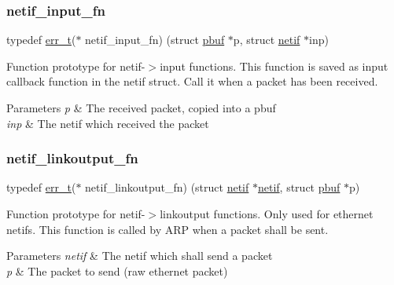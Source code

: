 \subsubsection{\texorpdfstring{netif\+\_\+input\+\_\+fn}{netif\_input\_fn}}
{\footnotesize\ttfamily typedef \hyperlink{group__infrastructure__errors_gaf02d9da80fd66b4f986d2c53d7231ddb}{err\+\_\+t}($\ast$ netif\+\_\+input\+\_\+fn) (struct \hyperlink{structpbuf}{pbuf} $\ast$p, struct \hyperlink{structnetif}{netif} $\ast$inp)}

Function prototype for netif-\/$>$input functions. This function is saved as \textquotesingle{}input\textquotesingle{} callback function in the netif struct. Call it when a packet has been received.


\begin{DoxyParams}{Parameters}
{\em p} & The received packet, copied into a pbuf \\
\hline
{\em inp} & The netif which received the packet \\
\hline
\end{DoxyParams}
\mbox{\label{openmote-cc2538_2lwip_2src_2include_2lwip_2netif_8h_ab75e9d808bc1b788bea84213e6a111ed}} 
\subsubsection{\texorpdfstring{netif\+\_\+linkoutput\+\_\+fn}{netif\_linkoutput\_fn}}
{\footnotesize\ttfamily typedef \hyperlink{group__infrastructure__errors_gaf02d9da80fd66b4f986d2c53d7231ddb}{err\+\_\+t}($\ast$ netif\+\_\+linkoutput\+\_\+fn) (struct \hyperlink{structnetif}{netif} $\ast$\hyperlink{structnetif}{netif}, struct \hyperlink{structpbuf}{pbuf} $\ast$p)}

Function prototype for netif-\/$>$linkoutput functions. Only used for ethernet netifs. This function is called by A\+RP when a packet shall be sent.


\begin{DoxyParams}{Parameters}
{\em netif} & The netif which shall send a packet \\
\hline
{\em p} & The packet to send (raw ethernet packet) \\
\hline
\end{DoxyParams}
\mbox{\label{openmote-cc2538_2lwip_2src_2include_2lwip_2netif_8h_a447d0a7e7c6e2396557c287b8b8c9436}} 
